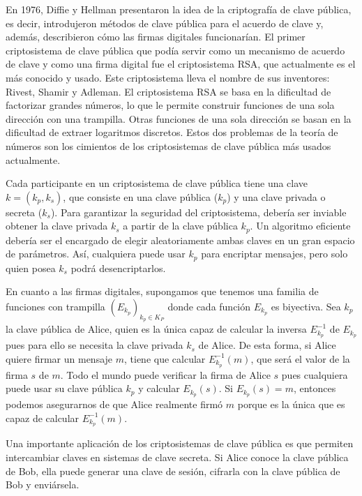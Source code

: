 En 1976, Diffie y Hellman \cite{Diffie_Hellman_1976} presentaron la idea de la criptografía de clave pública, es decir, introdujeron métodos de clave pública para el acuerdo de clave y, además, describieron cómo las firmas digitales funcionarían. El primer criptosistema de clave pública que podía servir como un mecanismo de acuerdo de clave y como una firma digital fue el criptosistema RSA, que actualmente es el más conocido y usado. Este criptosistema lleva el nombre de sus inventores: Rivest, Shamir y Adleman. El criptosistema RSA se basa en la dificultad de factorizar grandes números, lo que le permite construir funciones de una sola dirección con una trampilla. Otras funciones de una sola dirección se basan en la dificultad de extraer logaritmos discretos. Estos dos problemas de la teoría de números son los cimientos de los criptosistemas de clave pública más usados actualmente.

Cada participante en un criptosistema de clave pública tiene una clave $k = (k_p, k_s)$, que consiste en una clave pública ($k_p$) y una clave privada o secreta ($k_s$). Para garantizar la seguridad del criptosistema, debería ser inviable obtener la clave privada $k_s$ a partir de la clave pública $k_p$. Un algoritmo eficiente debería ser el encargado de elegir aleatoriamente ambas claves en un gran espacio de parámetros. Así, cualquiera puede usar $k_p$ para encriptar mensajes, pero solo quien posea $k_s$ podrá desencriptarlos.

En cuanto a las firmas digitales, supongamos que tenemos una familia de funciones con trampilla $\left( E_{k_p} \right)_{k_p \in K_P}$ donde cada función $E_{k_p}$ es biyectiva. Sea $k_p$ la clave pública de Alice, quien es la única capaz de calcular la inversa $E_{k_p}^{-1}$ de $E_{k_p}$ pues para ello se necesita la clave privada $k_s$ de Alice. De esta forma, si Alice quiere firmar un mensaje $m$, tiene que calcular $E_{k_p}^{-1}(m)$, que será el valor de la firma $s$ de $m$. Todo el mundo puede verificar la firma de Alice $s$ pues cualquiera puede usar su clave pública $k_p$ y calcular $E_{k_p}(s)$. Si $E_{k_p} (s) = m$, entonces podemos asegurarnos de que Alice realmente firmó $m$ porque es la única que es capaz de calcular $E_{k_p}^{-1}(m)$.

Una importante aplicación de los criptosistemas de clave pública es que permiten intercambiar claves en sistemas de clave secreta. Si Alice conoce la clave pública de Bob, ella puede generar una clave de sesión, cifrarla con la clave pública de Bob y enviársela.  


